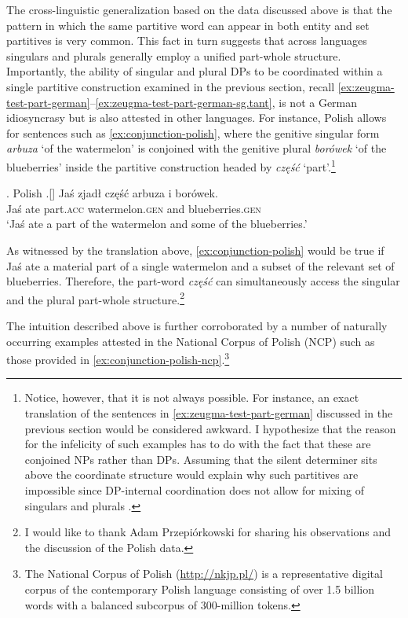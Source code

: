 The cross-linguistic generalization based on the data discussed above is that the pattern in which the same partitive word can appear in both entity and set partitives is very common. This fact in turn suggests that across languages singulars and plurals generally employ a unified part-whole structure. Importantly, the ability of singular and plural DPs to be coordinated within a single partitive construction examined in the previous section, recall \ref{ex:zeugma-test-part-german}--\ref{ex:zeugma-test-part-german-sg.tant}, is not a German idiosyncrasy but is also attested in other languages. For instance, Polish allows for sentences such as \ref{ex:conjunction-polish}, where the genitive singular form \textit{arbuza} `of the watermelon' is conjoined with the genitive plural \textit{borówek} `of the blueberries' inside the partitive construction headed by \textit{część} `part'.\footnote{Notice, however, that it is not always possible. For instance, an exact translation of the sentences in \ref{ex:zeugma-test-part-german} discussed in the previous section would be considered awkward. I hypothesize that the reason for the infelicity of such examples has to do with the fact that these are conjoined NPs rather than DPs. Assuming that the silent determiner sits above the coordinate structure would explain why such partitives are impossible since DP-internal coordination does not allow for mixing of singulars and plurals \citep{heycock_zamparelli2003coordinated}.} 

\ex. Polish\label{ex:conjunction-polish}
\bg.[] Jaś zjadł część arbuza i borówek.\\
Jaś ate part\textsc{.acc} watermelon\textsc{.gen} and blueberries\textsc{.gen}\\
`Jaś ate a part of the watermelon and some of the blueberries.'

As witnessed by the translation above, \ref{ex:conjunction-polish} would be true if Jaś ate a material part of a single watermelon and a subset of the relevant set of blueberries. Therefore, the part-word \textit{część} can simultaneously access the singular and the plural part-whole structure.\footnote{I would like to thank Adam Przepiórkowski for sharing his observations and the discussion of the Polish data.} 

The intuition described above is further corroborated by a number of naturally occurring examples attested in the National Corpus of Polish (NCP) \citep{przepiorkowski_et-al2012narodowy} such as those provided in \ref{ex:conjunction-polish-ncp}.\footnote{The National Corpus of Polish (\url{http://nkjp.pl/}) is a representative digital corpus of the contemporary Polish language consisting of over 1.5 billion words with a balanced subcorpus of 300-million tokens.}


